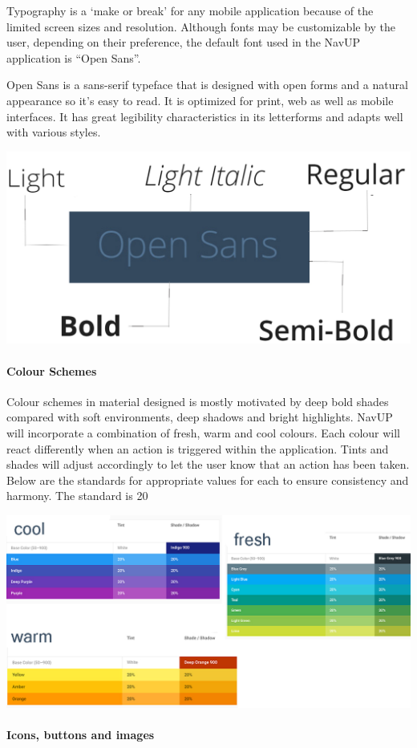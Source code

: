 \documentclass[11pt]{article}
\begin{document}
	Typography is a ‘make or break’ for any mobile application because of the limited screen sizes and resolution. Although fonts may be customizable by the user, depending on their preference, the default font used in the NavUP application is “Open Sans”.
	
	 Open Sans is a sans-serif typeface that is designed with open forms and a natural appearance so it’s easy to read. It is optimized for print, web as well as mobile interfaces. It has great legibility characteristics in its letterforms and adapts well with various styles. 
	
	\includegraphics[width=0.5\linewidth]{Images/openSans.jpg}\\[1cm]
	
	\paragraph{Colour Schemes}
	
	Colour schemes in material designed is mostly motivated by deep bold shades compared with soft environments, deep shadows and bright highlights. NavUP will incorporate a combination of fresh, warm and cool colours. Each colour will react differently when an action is triggered within the application. Tints and shades will adjust accordingly to let the user know that an action has been taken. Below are the standards for appropriate values for each to ensure consistency and harmony. The standard is 20%
	
	\includegraphics[width=0.5\linewidth]{Images/colourScheme.jpg}\\[1cm]	
	
		\paragraph{Icons, buttons and images}
	
\end{document}

